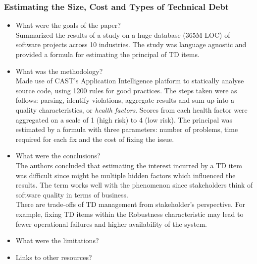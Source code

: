 \documentclass{mprop}
\begin{document}
\subsubsection{Estimating the Size, Cost and Types of Technical Debt} \cite{Curtis2012}
\begin{itemize}
\item What were the goals of the paper? \\
Summarized the results of a study on a huge database (365M LOC) of software projects across 10 industries.
The study was language agnostic and provided a formula for estimating the principal of TD items.
\item What was the methodology? \\
Made use of CAST's Application Intelligence platform to statically analyse source code, using 1200 rules for good practices. 
The steps taken were as follows: parsing, identify violations, aggregate results and sum up into a quality characteristics, or \textit{health factors}.
Scores from each health factor were aggregated on a scale of 1 (high risk) to 4 (low risk).
The principal was estimated by a formula with three parameters: number of problems, time required for each fix and the cost of fixing the issue.
\item What were the conclusions? \\
The authors concluded that estimating the interest incurred by a TD item was difficult since might be multiple hidden factors which influenced the results.
The term works well with the phenomenon since stakeholders think of software quality in terms of business. \\
There are trade-offs of TD management from stakeholder's perspective. 
For example, fixing TD items within the Robustness characteristic may lead to fewer operational failures and higher availability of the system.
\item What were the limitations? \\
\item Links to other resources? \\
\end{itemize}
\end{document}
